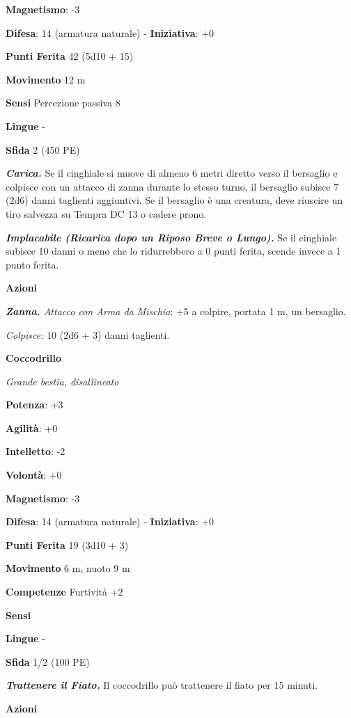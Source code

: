 \begin{multicols}{2}
\textbf{Magnetismo}: -3

\textbf{Difesa}: 14 (armatura naturale) - \textbf{Iniziativa}: +0

\textbf{Punti Ferita} 42 (5d10 + 15)

\textbf{Movimento} 12 m

\textbf{Sensi} Percezione passiva 8

\textbf{Lingue} -

\textbf{Sfida} 2 (450 PE)\smallskip

\emph{\textbf{Carica.}} Se il cinghiale si muove di almeno 6 metri
diretto verso il bersaglio e colpisce con un attacco di zanna durante lo
stesso turno, il bersaglio subisce 7 (2d6) danni taglienti aggiuntivi.
Se il bersaglio è una creatura, deve riuscire un tiro salvezza su Tempra
DC 13 o cadere prono.

\emph{\textbf{Implacabile (Ricarica dopo un Riposo Breve o Lungo).}} Se
il cinghiale subisce 10 danni o meno che lo ridurrebbero a 0 punti
ferita, scende invece a 1 punto ferita.

\smallskip\textbf{Azioni}

\emph{\textbf{Zanna.} Attacco con Arma da Mischia}: +5 a colpire,
portata 1 m, un bersaglio.

\emph{Colpisce:} 10 (2d6 + 3) danni taglienti.



\textbf{Coccodrillo}

\emph{Grande bestia, disallineato}

\textbf{Potenza}: +3

\textbf{Agilità}: +0

\textbf{Intelletto}: -2

\textbf{Volontà}: +0

\textbf{Magnetismo}: -3

\textbf{Difesa}: 14 (armatura naturale) - \textbf{Iniziativa}: +0

\textbf{Punti Ferita} 19 (3d10 + 3)

\textbf{Movimento} 6 m, nuoto 9 m

\textbf{Competenze} Furtività +2

\textbf{Sensi} 

\textbf{Lingue} -

\textbf{Sfida} 1/2 (100 PE)\smallskip

\emph{\textbf{Trattenere il Fiato.}} Il coccodrillo può trattenere il
fiato per 15 minuti.

\smallskip\textbf{Azioni}


\end{multicols}
